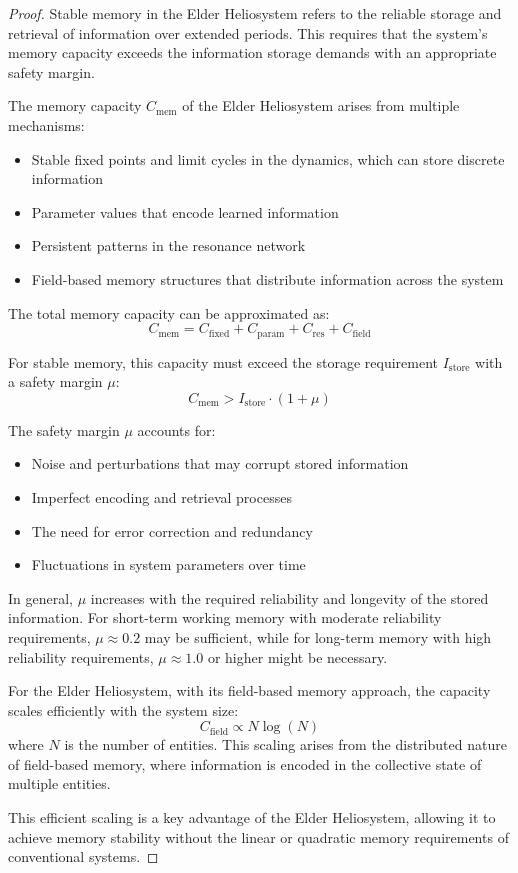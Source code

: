 \begin{proof}
Stable memory in the Elder Heliosystem refers to the reliable storage and retrieval of information over extended periods. This requires that the system's memory capacity exceeds the information storage demands with an appropriate safety margin.

The memory capacity $C_{\text{mem}}$ of the Elder Heliosystem arises from multiple mechanisms:
\begin{itemize}
    \item Stable fixed points and limit cycles in the dynamics, which can store discrete information
    \item Parameter values that encode learned information
    \item Persistent patterns in the resonance network
    \item Field-based memory structures that distribute information across the system
\end{itemize}

The total memory capacity can be approximated as:
\begin{equation}
C_{\text{mem}} = C_{\text{fixed}} + C_{\text{param}} + C_{\text{res}} + C_{\text{field}}
\end{equation}

For stable memory, this capacity must exceed the storage requirement $I_{\text{store}}$ with a safety margin $\mu$:
\begin{equation}
C_{\text{mem}} > I_{\text{store}} \cdot (1 + \mu)
\end{equation}

The safety margin $\mu$ accounts for:
\begin{itemize}
    \item Noise and perturbations that may corrupt stored information
    \item Imperfect encoding and retrieval processes
    \item The need for error correction and redundancy
    \item Fluctuations in system parameters over time
\end{itemize}

In general, $\mu$ increases with the required reliability and longevity of the stored information. For short-term working memory with moderate reliability requirements, $\mu \approx 0.2$ may be sufficient, while for long-term memory with high reliability requirements, $\mu \approx 1.0$ or higher might be necessary.

For the Elder Heliosystem, with its field-based memory approach, the capacity scales efficiently with the system size:
\begin{equation}
C_{\text{field}} \propto N \log(N)
\end{equation}
where $N$ is the number of entities. This scaling arises from the distributed nature of field-based memory, where information is encoded in the collective state of multiple entities.

This efficient scaling is a key advantage of the Elder Heliosystem, allowing it to achieve memory stability without the linear or quadratic memory requirements of conventional systems.
\end{proof}

